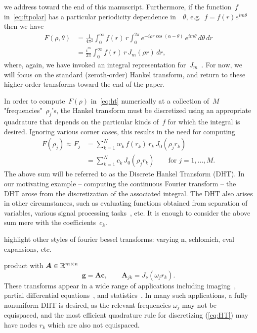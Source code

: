 we address toward the end of this manuscript. Furthermore, if the function~$f$
in~\eqref{eq:ftpolar} has a particular periodicity dependence in~~$\theta$,
e.g.~$f = f(r)e^{im\theta}$ then we have
\begin{equation}
  \begin{aligned}
  F(\rho,\theta) &= \frac{1}{4\pi^2} \int_0^\infty f(r) \, r \int_0^{2\pi} 
  e^{-i \rho r \cos(\alpha - \theta) } \, e^{im\theta}  \, d\theta \, dr \\
  &= \frac{i^m}{2\pi} \int_0^\infty f(r) \, r \, J_m(\rho r)  \, dr,
  \end{aligned}
\end{equation}
where, again, we have invoked an integral representation for~$J_m$~\cite{}.
For now, we will focus on the standard (zeroth-order) Hankel transform, and
return to these higher order transforms toward the end of the paper.

In order to compute~$F(\rho)$ in~\eqref{eq:ht} numerically at a collection
of~$M$ "frequencies"~$\rho_j$'s, the Hankel transform must be discretized using
an appropriate quadrature that depends on the particular kinds of~$f$ for which
the integral is desired. Ignoring various corner cases, this results in the need
for computing
\begin{equation}
  \begin{aligned}
  F(\rho_j) \approx F_j &= \sum_{k=1}^N w_k \, f(r_k) \, r_k \, J_0(\rho_j r_k) \\
  &= \sum_{k=1}^N c_k \, J_0(\rho_j r_k)
   \qquad \text{for } j = 1, \ldots, M.
  \end{aligned}
\end{equation}
The above sum will be referred to as the Discrete Hankel Transform (DHT). In our
motivating example -- computing the continuous Fourier transform -- the DHT
arose from the discretization of the associated integral. The DHT also arises in
other circumstances, such as evaluating functions obtained from separation of
variables, various signal processing tasks~\cite{}, etc. It is enough to
consider the above sum mere with the coefficients~$c_k$.

{\color{red}
highlight other styles of fourier bessel transforms: varying n, schlomich, eval
expansions, etc.
}

product with $\bm{A} \in \mathbb{R}^{m \times n}$
\begin{equation}
    \bm{g} = \bm{A}\bm{c}, \qquad \bm{A}_{jk} = J_\nu(\omega_j r_k).
\end{equation}
These transforms appear in a wide range of applications including
imaging~\cite{higgins1988hankel, zhao2013fourier}, partial differential
equations~\cite{bisseling1985fast,ali1999generalized}, and
statistics~\cite{lord1954a, genton2002nonparametric}. In many such
applications, a fully nonuniform DHT is desired, as the relevant frequencies
$\omega_j$ may not be equispaced, and the most efficient quadrature rule for
discretizing (\ref{eq:HT}) may have nodes $r_k$ which are also not equispaced.

